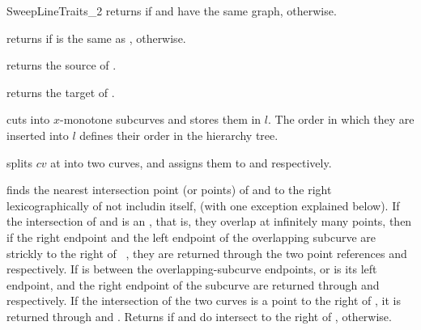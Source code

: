 \begin{ccRefConcept}{SweepLineTraits_2}
  {returns  if  and  have the same graph, 
   otherwise.}

  {returns  if  is the same as , 
  otherwise.}
    

  {returns the source of .}

  {returns the target of .}

  {cuts  into $x$-monotone subcurves and stores them in $l$.
  The order in which they are inserted into $l$ defines their order
  in the hierarchy tree.}

  {splits $cv$ at  into two curves, and assigns them to
   and  respectively.
  }

  {finds the nearest intersection point (or points) of  and 
  to the right lexicographically of  not includin  itself,
  (with one exception explained below).
  If the intersection of  and  is an , that is,
  they overlap at infinitely many points, then if the right endpoint and the
  left endpoint of the overlapping subcurve are strickly to the right of \
  , they are returned through the two point references  and
  \ccc{p2} respectively. If  is between the overlapping-subcurve
  endpoints, or \ccc{pt} is its left endpoint, \ccc{pt} and the right endpoint
  of the subcurve are returned through  and  respectively. If
  the intersection of the two curves is a point to the right of , it
  is returned through \ccc{p1} and \ccc{p2}.
  Returns  if  and  do intersect to the right of
  \ccc{pt}, \ccc{false} otherwise.}


\end{ccRefConcept}
